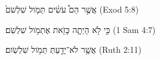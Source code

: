 
\begin{exe}

\ex\label{dispast_exs1}
\texthebrew{
אֲשֶׁ֣ר הֵם֩ עֹשִׂ֨ים תְּמֹ֤ול שִׁלְשֹׁם֙ 
} (Exod 5:8)

\ex\label{dispast_exs2}
\texthebrew{
כִּ֣י לֹ֥א הָיְתָ֛ה כָּזֹ֖את אֶתְמֹ֥ול שִׁלְשֹֽׁם׃ 
} (1 Sam 4:7)

\ex\label{dispast_exs3}
\texthebrew{
אֲשֶׁ֥ר לֹא־יָדַ֖עַתְּ תְּמֹ֥ול שִׁלְשֹֽׁום׃ 
} (Ruth 2:11)

\end{exe}
